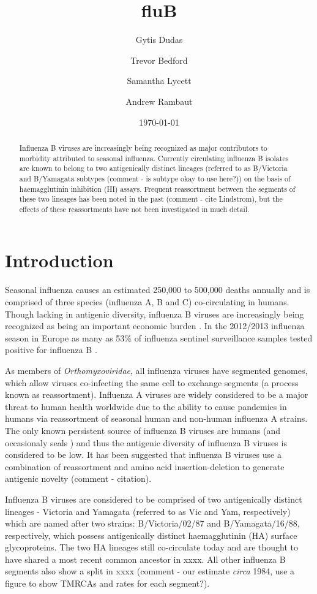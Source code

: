 \documentclass[11pt,oneside,letterpaper]{article}
\title{\vspace{1.0cm} \LARGE \bf fluB}
\author[1]{Gytis Dudas}
\author[1]{Trevor Bedford}
\author[1]{Samantha Lycett}
\author[1,2]{Andrew Rambaut}
\affil[1]{Institute of Evolutionary Biology, University of Edinburgh, Edinburgh, UK}
\affil[2]{Fogarty International Center, National Institutes of Health, Bethesda, MD, USA.}
\date{\today}
\begin{document}
\maketitle

\begin{abstract}

Influenza B viruses are increasingly being recognized as major contributors to morbidity attributed to seasonal influenza. 
Currently circulating influenza B isolates are known to belong to two antigenically distinct lineages (referred to as B/Victoria and B/Yamagata subtypes (comment - is subtype okay to use here?)) on the basis of haemagglutinin inhibition (HI) assays. 
Frequent reassortment between the segments of these two lineages has been noted in the past (comment - cite Lindstrom), but the effects of these reassortments have not been investigated in much detail.

\end{abstract}

\pagebreak


\section*{Introduction}
Seasonal influenza causes an estimated 250,000 to 500,000 deaths annually and is comprised of three species (influenza A, B and C) co-circulating in humans. Though lacking in antigenic diversity, influenza B viruses are increasingly being recognized as being an important economic burden \cite{paul-glezen2013}. 
In the 2012/2013 influenza season in Europe as many as 53\% of influenza sentinel surveillance samples tested positive for influenza B \cite{ECDC1213}. 

As members of \textit{Orthomyxoviridae}, all influenza viruses have segmented genomes, which allow viruses co-infecting the same cell to exchange segments (a process known as reassortment). 
Influenza A viruses are widely considered to be a major threat to human health worldwide due to the ability to cause pandemics in humans via reassortment of seasonal human and non-human influenza A strains. 
The only known persistent source of influenza B viruses are humans (and occasionaly seals \cite{osterhaus2000}) and thus the antigenic diversity of influenza B viruses is considered to be low. 
It has been suggested that influenza B viruses use a combination of reassortment and amino acid insertion-deletion to generate antigenic novelty (comment - citation).

Influenza B viruses are considered to be comprised of two antigenically distinct lineages - Victoria and Yamagata (referred to as Vic and Yam, respectively) which are named after two strains: B/Victoria/02/87 and B/Yamagata/16/88, respectively, which possess antigenically distinct haemagglutinin (HA) surface glycoproteins. 
The two HA lineages still co-circulate today and are thought to have shared a most recent common ancestor in xxxx. 
All other influenza B segments also show a split in xxxx (comment - our estimate \textit{circa} 1984, use a figure to show TMRCAs and rates for each segment?).
\end{document}

